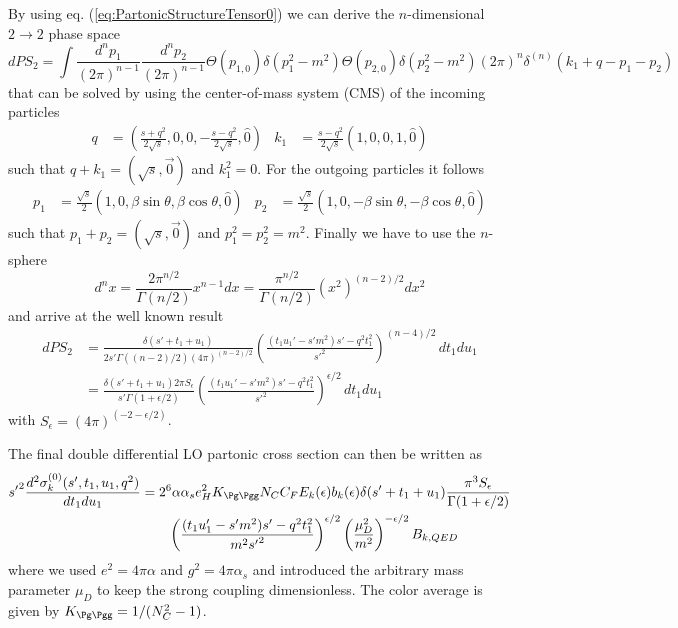 By using eq. (\ref{eq:PartonicStructureTensor0}) we can derive the $n$-dimensional $2\rightarrow 2$ phase space
\begin{equation}
dPS_2 = \!\int\!\!\frac{d^{n}p_1}{(2\pi)^{n-1}}\frac{d^{n}p_2}{(2\pi)^{n-1}}\Theta(p_{1,0})\delta(p_1^2-m^2)\Theta(p_{2,0})\delta(p_2^2-m^2)(2\pi)^n\delta^{(n)}(k_1+q-p_1-p_2)
\end{equation}
that can be solved by using the center-of-mass system (CMS) of the incoming particles\cite{Bojak:2000eu}
\begin{align}
q &= \left(\frac {s+q^2}{2\sqrt s},0,0,-\frac{s-q^2}{2\sqrt s},\hat 0\right) &
k_1 &= \frac {s-q^2}{2\sqrt s}\left(1,0,0,1,\hat 0\right)
\end{align}
such that $q+k_1=(\sqrt s,\vec 0)$ and $k_1^2 = 0$. For the outgoing particles it follows
\begin{align}
p_1 &= \frac{\sqrt s} 2 \left(1,0,\beta\sin\theta,\beta\cos\theta,\hat 0\right)&
p_2 &= \frac{\sqrt s} 2 \left(1,0,-\beta\sin\theta,-\beta\cos\theta,\hat 0\right)
\end{align}
such that $p_1+p_2 = (\sqrt s,\vec 0)$ and $p_1^2 = p_2^2=m^2$. Finally we have to use the $n$-sphere
\begin{equation}
d^nx = \frac{2\pi^{n/2}}{\Gamma(n/2)}x^{n-1} dx= \frac{\pi^{n/2}}{\Gamma(n/2)}(x^2)^{(n-2)/2} dx^2
\end{equation}
and arrive at the well known result\cite{Laenen1993162}
\begin{align}
dPS_2 &= \frac {\delta(s'+t_1+u_1)} {2s'\Gamma((n-2)/2)(4\pi)^{(n-2)/2}}\left(\frac{(t_1u_1'-s'm^2)s' - q^2t_1^2}{s'^2}\right)^{(n-4)/2}\,dt_1du_1\\
&= \frac {\delta(s'+t_1+u_1)2\pi S_\epsilon} {s'\Gamma(1+\epsilon/2)}\left(\frac{(t_1u_1'-s'm^2)s' - q^2t_1^2}{s'^2}\right)^{\epsilon/2}\,dt_1du_1
\end{align}
with $S_\epsilon = (4\pi)^{(-2-\epsilon/2)}$.

The final double differential LO partonic cross section can then be written as
\begin{align}
{s'}^2\frac{d^2\sigma_{k}^{(0)}(s',t_1,u_1,q^2)}{dt_1du_1} &= 2^6\alpha\alpha_s e_H^2 K_{\Pg\Pgg}N_CC_F E_k(\epsilon) b_k(\epsilon)\delta(s'+t_1+u_1) \frac{\pi^3S_\epsilon}{\Gamma(1+\epsilon/2)}  \nonumber\\
 &\hspace{20pt} \left(\frac{(t_1u_1'-s'm^2)s' - q^2t_1^2}{m^2{s'}^2}\right)^{\epsilon/2}\left(\frac{\mu_D^2}{m^2}\right)^{-\epsilon/2} B_{k,QED}
\end{align}
where we used $e^2=4\pi\alpha$ and $g^2=4\pi\alpha_s$ and introduced the arbitrary mass parameter $\mu_D$ to keep the strong coupling dimensionless. The color average is given by $K_{\Pg\Pgg} = 1/(N_C^2-1)$.

